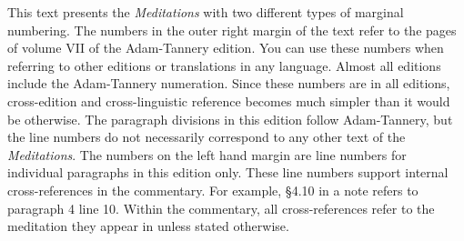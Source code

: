 This text presents the \textit{Meditations} with two different types of marginal numbering. The numbers in the outer right margin of the text refer to the pages of volume VII of the Adam-Tannery edition. You can use these numbers when referring to other editions or translations in any language. Almost all editions include the Adam-Tannery numeration. Since these numbers are in all editions, cross-edition and cross-linguistic reference becomes much simpler than it would be otherwise. The paragraph divisions in this edition follow Adam-Tannery, but the line numbers do not necessarily correspond to any other text of the \textit{Meditations}. The numbers on the left hand margin are line numbers for individual paragraphs in this edition only. These line numbers support internal cross-references in the commentary. For example, §4.10 in a note refers to paragraph 4 line 10. Within the commentary, all cross-references refer to the meditation they appear in unless stated otherwise.
